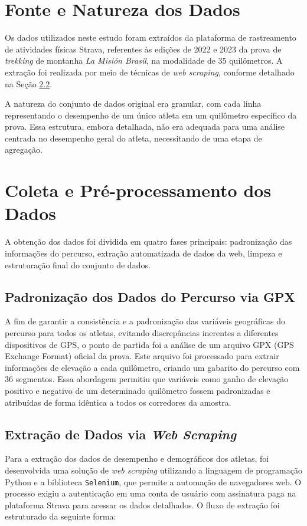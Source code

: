 \section{Fonte e Natureza dos Dados}
\label{sec:fonte_dados}

Os dados utilizados neste estudo foram extraídos da plataforma de rastreamento de atividades físicas Strava, referentes às edições de 2022 e 2023 da prova de \emph{trekking} de montanha \textit{La Misión Brasil}, na modalidade de 35 quilômetros. A extração foi realizada por meio de técnicas de \emph{web scraping}, conforme detalhado na Seção \ref{subsec:scraping}.

A natureza do conjunto de dados original era granular, com cada linha representando o desempenho de um único atleta em um quilômetro específico da prova. Essa estrutura, embora detalhada, não era adequada para uma análise centrada no desempenho geral do atleta, necessitando de uma etapa de agregação.

\section{Coleta e Pré-processamento dos Dados}

A obtenção dos dados foi dividida em quatro fases principais: padronização das informações do percurso, extração automatizada de dados da web, limpeza e estruturação final do conjunto de dados.

\subsection{Padronização dos Dados do Percurso via GPX}
\label{subsec:gpx}

A fim de garantir a consistência e a padronização das variáveis geográficas do percurso para todos os atletas, evitando discrepâncias inerentes a diferentes dispositivos de GPS, o ponto de partida foi a análise de um arquivo GPX (GPS Exchange Format) oficial da prova. Este arquivo foi processado para extrair informações de elevação a cada quilômetro, criando um gabarito do percurso com 36 segmentos. Essa abordagem permitiu que variáveis como ganho de elevação positivo e negativo de um determinado quilômetro fossem padronizadas e atribuídas de forma idêntica a todos os corredores da amostra.

\subsection{Extração de Dados via \textit{Web Scraping}}
\label{subsec:scraping}
Para a extração dos dados de desempenho e demográficos dos atletas, foi desenvolvida uma solução de \emph{web scraping} utilizando a linguagem de programação Python e a biblioteca \texttt{Selenium}, que permite a automação de navegadores web. O processo exigiu a autenticação em uma conta de usuário com assinatura paga na plataforma Strava para acessar os dados detalhados. O fluxo de extração foi estruturado da seguinte forma:

